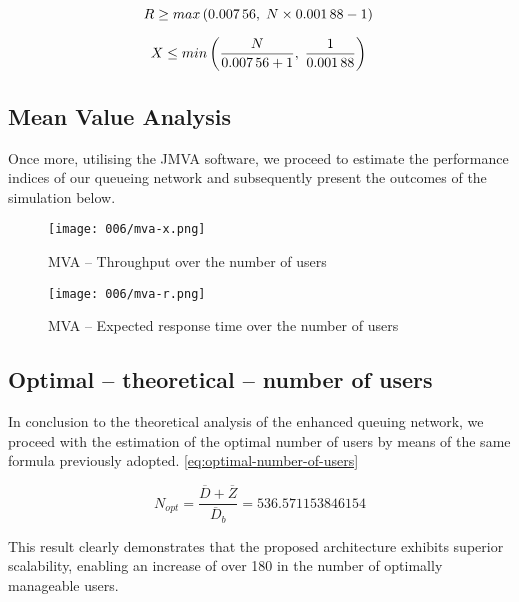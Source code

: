 \[
 R \geq max\left(\num[round-mode=places, round-precision=5]{0.00756138888888889},\;N\times\num[round-mode=places, round-precision=5]{0.00187777777777778}-1\right) \\
\]

\[
 X \leq min\left(\frac{N}{\num[round-mode=places, round-precision=5]{0.00756138888888889}+1},\;\frac{1}{\num[round-mode=places, round-precision=5]{0.00187777777777778}}\right) \\
\]

\subsection{Mean Value Analysis}

Once more, utilising the JMVA software, we proceed to estimate the performance indices of our queueing network and subsequently present the outcomes of the simulation below.

\begin{figure}[h]
	\centering
	\texttt{[image: 006/mva-x.png]}
	\caption{MVA -- Throughput over the number of users}
\end{figure}

\clearpage

\begin{figure}[h]
	\centering
	\texttt{[image: 006/mva-r.png]}
	\caption{MVA -- Expected response time over the number of users}
\end{figure}

\subsection{Optimal -- theoretical -- number of users}

In conclusion to the theoretical analysis of the enhanced queuing network, we proceed with the estimation of the optimal number of users by means of the same formula previously adopted. \ref{eq:optimal-number-of-users}

\begin{equation}
	N_{opt} = \frac{\overline{D} + \overline{Z}}{\overline{D}_b} = \num[round-mode=places, round-precision=5]{536.571153846154}
\end{equation}

This result clearly demonstrates that the proposed architecture exhibits superior scalability, enabling an increase of over 180 in the number of optimally manageable users.
